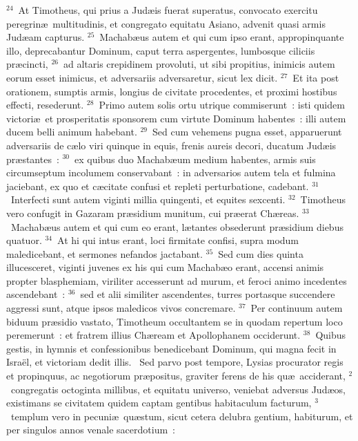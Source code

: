 ${}^{24}$~At Timotheus, qui prius a Jud\ae is fuerat superatus, convocato exercitu peregrin\ae\ multitudinis, et congregato equitatu Asiano, advenit quasi armis Jud\ae am capturus.
${}^{25}$~Machab\ae us autem et qui cum ipso erant, appropinquante illo, deprecabantur Dominum, caput terra aspergentes, lumbosque ciliciis pr\ae cincti,
${}^{26}$~ad altaris crepidinem provoluti, ut sibi propitius, inimicis autem eorum esset inimicus, et adversariis adversaretur, sicut lex dicit.
${}^{27}$~Et ita post orationem, sumptis armis, longius de civitate procedentes, et proximi hostibus effecti, resederunt.
${}^{28}$~Primo autem solis ortu utrique commiserunt~: isti quidem victori\ae\ et prosperitatis sponsorem cum virtute Dominum habentes~: illi autem ducem belli animum habebant.
${}^{29}$~Sed cum vehemens pugna esset, apparuerunt adversariis de c\ae lo viri quinque in equis, frenis aureis decori, ducatum Jud\ae is pr\ae stantes~:
${}^{30}$~ex quibus duo Machab\ae um medium habentes, armis suis circumseptum incolumem conservabant~: in adversarios autem tela et fulmina jaciebant, ex quo et c\ae citate confusi et repleti perturbatione, cadebant.
${}^{31}$~Interfecti sunt autem viginti millia quingenti, et equites sexcenti.
${}^{32}$~Timotheus vero confugit in Gazaram pr\ae sidium munitum, cui pr\ae erat Ch\ae reas.
${}^{33}$~Machab\ae us autem et qui cum eo erant, l\ae tantes obsederunt pr\ae sidium diebus quatuor.
${}^{34}$~At hi qui intus erant, loci firmitate confisi, supra modum maledicebant, et sermones nefandos jactabant.
${}^{35}$~Sed cum dies quinta illucesceret, viginti juvenes ex his qui cum Machab\ae o erant, accensi animis propter blasphemiam, viriliter accesserunt ad murum, et feroci animo incedentes ascendebant~:
${}^{36}$~sed et alii similiter ascendentes, turres portasque succendere aggressi sunt, atque ipsos maledicos vivos concremare.
${}^{37}$~Per continuum autem biduum pr\ae sidio vastato, Timotheum occultantem se in quodam repertum loco peremerunt~: et fratrem illius Ch\ae ream et Apollophanem occiderunt.
${}^{38}$~Quibus gestis, in hymnis et confessionibus benedicebant Dominum, qui magna fecit in Isra\"el, et victoriam dedit illis.
~\lettrine[lines=10,image=true,loversize=0.05,lraise=-0.03]{S}{}ed parvo post tempore, Lysias procurator regis et propinquus, ac negotiorum pr\ae positus, graviter ferens de his qu\ae\ acciderant,
${}^{2}$~congregatis octoginta millibus, et equitatu universo, veniebat adversus Jud\ae os, existimans se civitatem quidem captam gentibus habitaculum facturum,
${}^{3}$~templum vero in pecuni\ae\ qu\ae stum, sicut cetera delubra gentium, habiturum, et per singulos annos venale sacerdotium~:
